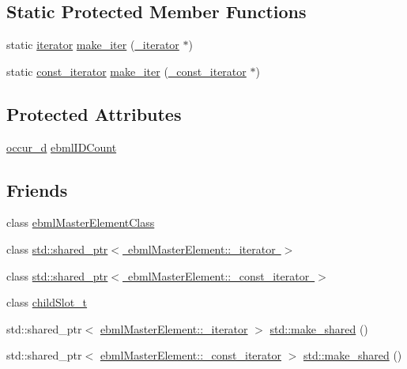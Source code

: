 \subsection*{Static Protected Member Functions}
\begin{DoxyCompactItemize}
\item 
static \mbox{\hyperlink{classebml_1_1ebmlMasterElement_1_1iterator}{iterator}} \mbox{\hyperlink{classebml_1_1ebmlMasterElement_a5c9950e1211b1dae82f84c64810317d0}{make\+\_\+iter}} (\mbox{\hyperlink{classebml_1_1ebmlMasterElement_1_1__iterator}{\+\_\+iterator}} $\ast$)
\item 
static \mbox{\hyperlink{classebml_1_1ebmlMasterElement_1_1const__iterator}{const\+\_\+iterator}} \mbox{\hyperlink{classebml_1_1ebmlMasterElement_a48eb2b65fb32886718ea29637c075052}{make\+\_\+iter}} (\mbox{\hyperlink{classebml_1_1ebmlMasterElement_1_1__const__iterator}{\+\_\+const\+\_\+iterator}} $\ast$)
\end{DoxyCompactItemize}
\subsection*{Protected Attributes}
\begin{DoxyCompactItemize}
\item 
\mbox{\hyperlink{namespaceebml_a4ecb956f78f49ef5e24e0d0db9b646f4}{occur\+\_\+d}} \mbox{\hyperlink{classebml_1_1ebmlMasterElement_a1d98e7686af827ef3bc4017a93c998af}{ebml\+I\+D\+Count}}
\end{DoxyCompactItemize}
\subsection*{Friends}
\begin{DoxyCompactItemize}
\item 
class \mbox{\hyperlink{classebml_1_1ebmlMasterElement_aa005a2a7ef20ef779d383e3da2e0b46d}{ebml\+Master\+Element\+Class}}
\item 
class \mbox{\hyperlink{classebml_1_1ebmlMasterElement_acc1799ddfada4f75c065e88d8c176bb5}{std\+::shared\+\_\+ptr$<$ ebml\+Master\+Element\+::\+\_\+iterator $>$}}
\item 
class \mbox{\hyperlink{classebml_1_1ebmlMasterElement_ac63f87842788cea854608a2d5721c4d5}{std\+::shared\+\_\+ptr$<$ ebml\+Master\+Element\+::\+\_\+const\+\_\+iterator $>$}}
\item 
class \mbox{\hyperlink{classebml_1_1ebmlMasterElement_a7da7c20d77d2ab85d170c3db144f18ec}{child\+Slot\+\_\+t}}
\item 
std\+::shared\+\_\+ptr$<$ \mbox{\hyperlink{classebml_1_1ebmlMasterElement_1_1__iterator}{ebml\+Master\+Element\+::\+\_\+iterator}} $>$ \mbox{\hyperlink{classebml_1_1ebmlMasterElement_aa9d9b36afd7dc8f1abadb2ad899fc529}{std\+::make\+\_\+shared}} ()
\item 
std\+::shared\+\_\+ptr$<$ \mbox{\hyperlink{classebml_1_1ebmlMasterElement_1_1__const__iterator}{ebml\+Master\+Element\+::\+\_\+const\+\_\+iterator}} $>$ \mbox{\hyperlink{classebml_1_1ebmlMasterElement_a125dd83c2f0778f79bc0012e8d126f59}{std\+::make\+\_\+shared}} ()
\end{DoxyCompactItemize}
